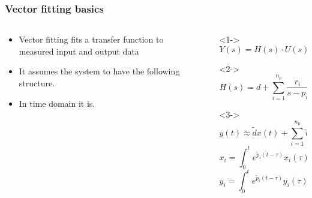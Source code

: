 \begin{frame}
	\frametitle{Vector fitting basics}
	\begin{columns}[c]
		\begin{column}{0.4\textwidth}
			\begin{itemize}
				\item<1-> Vector fitting fits a transfer function to measured input and output data
				\item<2-> It assumes the system to have the following structure.
				\item<3-> In time domain it is.
			\end{itemize}
		\end{column}
		\begin{column}{0.6\textwidth}
			\begin{itemize}
				\item[]<1->
				\begin{equation}
					Y(s) = H(s)\cdot U(s)
				\end{equation}
				\item[]<2->
				\begin{equation}
					H(s) = d + \sum^{n_p}_{i=1}\frac{r_i}{s-p_i}
				\end{equation}
				\item[]<3->
				\begin{equation}\label{eq:VFTD}
    			y(t) \approx \tilde{d} x(t) + \sum^{n_p}_{i=1} \tilde{r}_ix_i-\sum^{n_p}_{i=1}\tilde{k}_iy_i
					\end{equation}
					\begin{equation}
    \label{eq:XVFWave}
    x_i = \int^t_0 e^{\tilde{p}_i(t-\tau)}x_i(\tau)d\tau
\end{equation}
\begin{equation}
    \label{eq:YVFWave}
    y_i = \int^t_0 e^{\tilde{p}_{i}(t-\tau)}y_i(\tau)d\tau
\end{equation}
			\end{itemize}
	\end{column}
	\end{columns}
	\end{frame}


